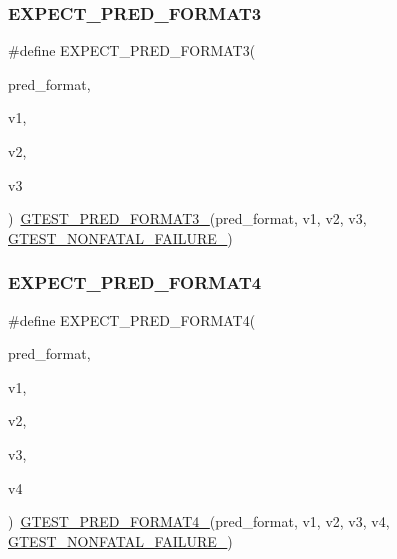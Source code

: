 \mbox{\label{googletest-master_2googletest_2include_2gtest_2gtest__pred__impl_8h_a7285708fa5d37d6d8ed5b5e59da08bae}} 
\subsubsection{\texorpdfstring{EXPECT\_PRED\_FORMAT3}{EXPECT\_PRED\_FORMAT3}}
{\footnotesize\ttfamily \#define E\+X\+P\+E\+C\+T\+\_\+\+P\+R\+E\+D\+\_\+\+F\+O\+R\+M\+A\+T3(\begin{DoxyParamCaption}\item[{}]{pred\+\_\+format,  }\item[{}]{v1,  }\item[{}]{v2,  }\item[{}]{v3 }\end{DoxyParamCaption})~\mbox{\hyperlink{_obj__test_2lib_2googletest-release-1_88_81_2googletest_2include_2gtest_2gtest__pred__impl_8h_a49cdf8707268ee932bb772d879a226cc}{G\+T\+E\+S\+T\+\_\+\+P\+R\+E\+D\+\_\+\+F\+O\+R\+M\+A\+T3\+\_\+}}(pred\+\_\+format, v1, v2, v3, \mbox{\hyperlink{_obj__test_2lib_2googletest-release-1_88_81_2googletest_2include_2gtest_2internal_2gtest-internal_8h_a6cb7482cfa03661a91c698eb5895f642}{G\+T\+E\+S\+T\+\_\+\+N\+O\+N\+F\+A\+T\+A\+L\+\_\+\+F\+A\+I\+L\+U\+R\+E\+\_\+}})}

\mbox{\label{googletest-master_2googletest_2include_2gtest_2gtest__pred__impl_8h_a3354347de0f2445400b509cf39dce1dc}} 
\subsubsection{\texorpdfstring{EXPECT\_PRED\_FORMAT4}{EXPECT\_PRED\_FORMAT4}}
{\footnotesize\ttfamily \#define E\+X\+P\+E\+C\+T\+\_\+\+P\+R\+E\+D\+\_\+\+F\+O\+R\+M\+A\+T4(\begin{DoxyParamCaption}\item[{}]{pred\+\_\+format,  }\item[{}]{v1,  }\item[{}]{v2,  }\item[{}]{v3,  }\item[{}]{v4 }\end{DoxyParamCaption})~\mbox{\hyperlink{_obj__test_2lib_2googletest-release-1_88_81_2googletest_2include_2gtest_2gtest__pred__impl_8h_abd207ed869491ba4bba29f8df37b7355}{G\+T\+E\+S\+T\+\_\+\+P\+R\+E\+D\+\_\+\+F\+O\+R\+M\+A\+T4\+\_\+}}(pred\+\_\+format, v1, v2, v3, v4, \mbox{\hyperlink{_obj__test_2lib_2googletest-release-1_88_81_2googletest_2include_2gtest_2internal_2gtest-internal_8h_a6cb7482cfa03661a91c698eb5895f642}{G\+T\+E\+S\+T\+\_\+\+N\+O\+N\+F\+A\+T\+A\+L\+\_\+\+F\+A\+I\+L\+U\+R\+E\+\_\+}})}

